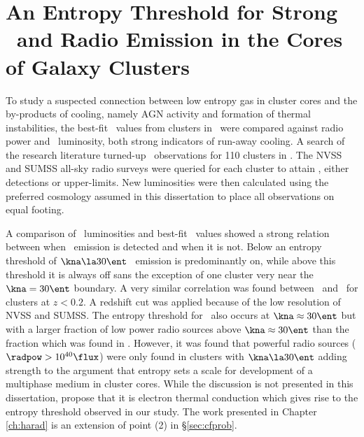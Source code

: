 \section{An Entropy Threshold for Strong \halpha\ and Radio Emission
in the Cores of Galaxy Clusters}

To study a suspected connection between low entropy gas in cluster
cores and the by-products of cooling, namely AGN activity and
formation of thermal instabilities, the best-fit \kna\ values from
clusters in \accept\ were compared against radio power and \halpha\
luminosity, both strong indicators of run-away cooling. A search of
the research literature turned-up \halpha\ observations for 110
clusters in \accept. The NVSS and SUMSS all-sky radio surveys were
queried for each cluster to attain \radpow, either detections or
upper-limits. New luminosities were then calculated using the
preferred cosmology assumed in this dissertation to place all
observations on equal footing.

A comparison of \halpha\ luminosities and best-fit \kna\ values showed
a strong relation between when \halpha\ emission is detected and when
it is not. Below an entropy threshold of $\kna \la 30 \ent$ \halpha\
emission is predominantly on, while above this threshold it is always
off sans the exception of one cluster very near the $\kna = 30 \ent$
boundary. A very similar correlation was found between \radpow\ and
\kna\ for clusters at $z < 0.2$. A redshift cut was applied because of
the low resolution of NVSS and SUMSS. The entropy threshold for
\radpow\ also occurs at $\kna \approx 30 \ent$ but with a larger
fraction of low power radio sources above $\kna \approx 30 \ent$ than
the fraction which was found in \halpha. However, it was found that
powerful radio sources ($\radpow > 10^{40} \flux$) were only found in
clusters with $\kna \la 30 \ent$ adding strength to the argument that
entropy sets a scale for development of a multiphase medium in cluster
cores. While the discussion is not presented in this dissertation,
\cite{conduction} propose that it is electron thermal conduction which
gives rise to the entropy threshold observed in our study. The work
presented in Chapter \ref{ch:harad} is an extension of point (2) in
\S\ref{sec:cfprob}.

